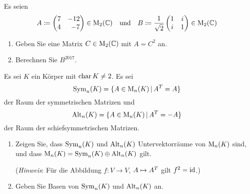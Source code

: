 \documentclass[a4paper, 10pt]{scrartcl}
\begin{document}
\begin{question}[subtitle = Wurzeln und Potenzen]
  Es seien
  \[
              A
    \coloneqq \begin{pmatrix*}[r]
                7 & -12 \\
                4 &  -7
              \end{pmatrix*}
              \in \matrices{2}{\Complex}
    \quad\text{und}\quad
              B
    \coloneqq \frac{1}{\sqrt{2}}
              \begin{pmatrix}
                1 & i \\
                i & 1
              \end{pmatrix}
              \in \matrices{2}{\Complex}
  \]
  \begin{enumerate}
    \item
      Geben Sie eine Matrix $C \in \operatorname{M}_{2}(\mathbb{C})$ mit $A = C^2$ an.
    \item
      Berechnen Sie $B^{2017}$.
  \end{enumerate}
\end{question}





\begin{question}[subtitle = Symmetrische und schiefsymmetrische Matrizen]
  Es sei $K$ ein Körper mit $\operatorname{char} K \neq 2$.
  Es sei
  \[
      \operatorname{Sym}_{n}(K)
    = \{ A \in \operatorname{M}_{n}(K) \,|\, A^T = A \}
  \]
  der Raum der symmetrischen Matrizen und
  \[
      \operatorname{Alt}_{n}(K)
    = \{ A \in \operatorname{M}_{n}(K) \,|\, A^T = -A\}
  \]
  der Raum der schiefsymmetrischen Matrizen.
  \begin{enumerate}
    \item
      Zeigen Sie, dass $\operatorname{Sym}_{n}(K)$ und $\operatorname{Alt}_{n}(K)$ Untervektorräume von $\operatorname{M}_{n}(K)$ sind, und dass $\operatorname{M}_{n}(K) = \operatorname{Sym}_{n}(K) \oplus \operatorname{Alt}_{n}(K)$ gilt.
      
      (\emph{Hinweis}:
       Für die Abbildung $f \colon V \to V$, $A \mapsto A^T$ gilt $f^2 = \operatorname{id}$.)
    \item
      Geben Sie Basen von $\operatorname{Sym}_{n}(K)$ und $\operatorname{Alt}_{n}(K)$ an.
  \end{enumerate}
\end{question}
\end{document}
